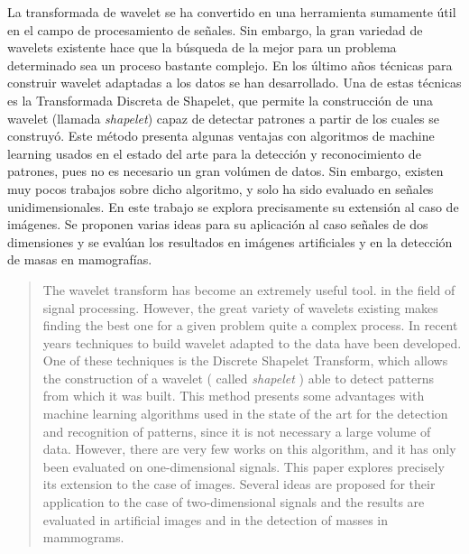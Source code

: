 \begin{resumen}
	La transformada de wavelet se ha convertido en una herramienta sumamente útil en el campo de procesamiento
	de señales. Sin embargo, la gran variedad de wavelets existente hace que la búsqueda de la mejor para 
	un problema determinado sea un proceso bastante complejo. En los último años técnicas para construir wavelet
	adaptadas a los datos se han desarrollado. Una de estas técnicas es la Transformada Discreta de Shapelet, que
	permite la construcción de una wavelet (llamada \textit{shapelet}) capaz de detectar patrones a partir de los cuales
	se construyó. Este método presenta algunas ventajas con algoritmos de machine learning usados en el estado del 
	arte para la detección y reconocimiento de patrones, pues no es necesario un gran volúmen de datos. Sin embargo,
	existen muy pocos trabajos sobre dicho algoritmo, y solo ha sido evaluado en señales unidimensionales. En este
	trabajo se explora precisamente su extensión al caso de imágenes. Se proponen varias ideas para su aplicación
	al caso señales de dos dimensiones y se evalúan los resultados en imágenes artificiales y en la detección de masas en mamografías.
\end{resumen}

\begin{abstract}
	The wavelet transform has become an extremely useful tool.
	in the field of signal processing. However, the great variety of wavelets
	existing  makes finding the best one for a given problem
	quite a complex process. In recent years techniques to build wavelet
	adapted to the data have been developed. One of these techniques is the 
	Discrete Shapelet Transform, which allows the construction of a wavelet ( called \textit{shapelet} )
	able to detect patterns from which it was built. This method presents
	some advantages with machine learning algorithms used in the state of the art 
	for the detection and recognition of patterns, since it is not necessary a large volume
	of data. However, there are very few works on this algorithm, and it has only
	been evaluated on one-dimensional signals. This paper explores precisely
	its extension to the case of images. Several ideas are proposed for their application to the case of
	two-dimensional signals and the results are evaluated in artificial images and in the
	detection of masses in mammograms.
\end{abstract}
